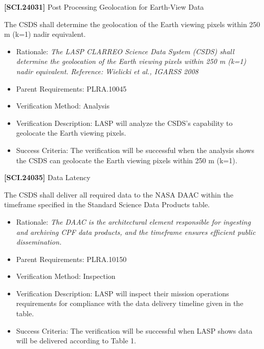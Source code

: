 \documentclass[12pt,oneside,oldfontcommands]{memoir}
\begin{document}
\textbf{[SCI.24031]} Post Processing Geolocation for Earth-View Data

The \gls{CSDS} shall determine the geolocation of the Earth viewing pixels within 250 m (k=1) nadir equivalent.

\begin{itemize}
\item{} Rationale: \emph{The LASP CLARREO Science Data System (CSDS) shall determine the geolocation of the Earth viewing pixels within 250 m (k=1) nadir equivalent. Reference: Wielicki et al., IGARSS 2008}

\item{} Parent Requirements: PLRA.10045

\item{} Verification Method: Analysis

\item{} Verification Description: \gls{LASP} will analyze the \gls{CSDS}'s capability to geolocate the Earth viewing pixels.

\item{} Success Criteria: The verification will be successful when the \gls{analysis} shows the \gls{CSDS} can geolocate the Earth viewing pixels within 250 m (k=1).

\end{itemize}

\textbf{[SCI.24035]} Data Latency

The \gls{CSDS} shall deliver all required data to the NASA \gls{DAAC} within the timeframe specified in the Standard Science Data Products table.

\begin{itemize}
\item{} Rationale: \emph{The DAAC is the architectural element responsible for ingesting and archiving CPF data products, and the timeframe ensures efficient public dissemination.}

\item{} Parent Requirements: PLRA.10150

\item{} Verification Method: Inspection

\item{} Verification Description: \gls{LASP} will inspect their mission operations requirements for compliance with the data delivery timeline given in the table.

\item{} Success Criteria: The verification will be successful when \gls{LASP} shows data will be delivered according to Table 1.

\end{itemize}
\end{document}
